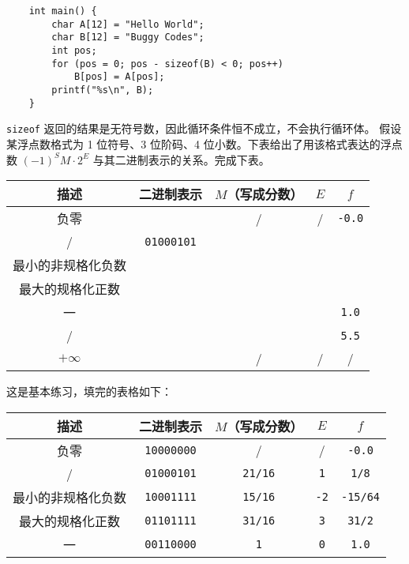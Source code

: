 \begin{problems}
        \begin{verbatim}
    int main() {
        char A[12] = "Hello World";
        char B[12] = "Buggy Codes";
        int pos;
        for (pos = 0; pos - sizeof(B) < 0; pos++)
            B[pos] = A[pos];
        printf("%s\n", B);
    }
        \end{verbatim}
        \sol \verb|sizeof| 返回的结果是无符号数，因此循环条件恒不成立，不会执行循环体。
        \pro 假设某浮点数格式为 1 位符号、3 位阶码、4 位小数。下表给出了用该格式表达的浮点数 $(-1)^SM \cdot 2^E$ 与其二进制表示的关系。完成下表。
        \begin{table}[H]
            \centering
            \begin{tabular}{|c|c|c|c|c|}
                \hline
                描述 & 二进制表示 & $M$（写成分数） & $E$ & $f$ \\ \hline
                负零 &  & / & / & \texttt{-0.0} \\ \hline
                / & \verb|01000101| &  &  &  \\ \hline
                最小的非规格化负数 &  &  &  &  \\ \hline
                最大的规格化正数 &  &  &  &  \\ \hline
                一 &  &  &  & \texttt{1.0} \\ \hline
                / &  &  &  & \texttt{5.5} \\ \hline
                $+\infty$ &  & / & / & / \\ \hline
            \end{tabular}
        \end{table}
        \sol 这是基本练习，填完的表格如下：
        \begin{table}[H]
            \centering
            \begin{tabular}{|c|c|c|c|c|}
                \hline
                描述 & 二进制表示 & $M$（写成分数） & $E$ & $f$ \\ \hline
                负零 & \verb|10000000| & / & / & \texttt{-0.0} \\ \hline
                / & \verb|01000101| & \verb|21/16| & \verb|1| & \verb|1/8| \\ \hline
                最小的非规格化负数 & \verb|10001111| & \verb|15/16| & \verb|-2| & \verb|-15/64| \\ \hline
                最大的规格化正数 & \verb|01101111| & \verb|31/16| & \verb|3| & \verb|31/2| \\ \hline
                一 & \verb|00110000| & \verb|1| & \verb|0| & \texttt{1.0} \\ \hline

\end{tabular}
\end{table}
\end{problems}
